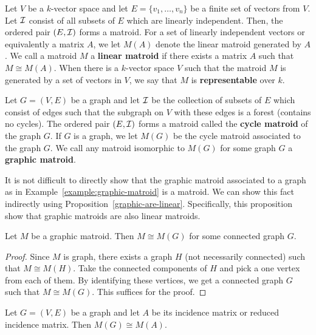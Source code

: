 \documentclass{puthesis-UG}
\begin{document}
\begin{example}  \label{linear-matroid}
	Let $V$ be a $k$-vector space and let $E = \{v_1, \ldots, v_n\}$ be a finite set of vectors from $V$. Let $\mathcal{I}$ consist of all subsets of $E$ which are linearly independent. Then, the ordered pair $(E, \mathcal{I})$ forms a matroid. For a set of linearly independent vectors or equivalently a matrix $A$, we let $M(A)$ denote the linear matroid generated by $A$. We call a matroid $M$ a \textbf{linear matroid} if there exists a matrix $A$ such that $M \cong M(A)$. When there is a $k$-vector space $V$ such that the matroid $M$ is generated by a set of vectors in $V$, we say that $M$ is \textbf{representable} over $k$. 
\end{example}

\begin{example}  \label{example:graphic-matroid}
	Let $G = (V, E)$ be a graph and let $\mathcal{I}$ be the collection of subsets of $E$ which consist of edges such that the subgraph on $V$ with these edges is a forest (contains no cycles). The ordered pair $(E, \mathcal{I})$ forms a matroid called the \textbf{cycle matroid} of the graph $G$. If $G$ is a graph, we let $M(G)$ be the cycle matroid associated to the graph $G$. We call any matroid isomorphic to $M(G)$ for some graph $G$ a \textbf{graphic matroid}. 
\end{example}

It is not difficult to directly show that the graphic matroid associated to a graph as in Example~\ref{example:graphic-matroid} is a matroid. We can show this fact indirectly using Proposition~\ref{graphic-are-linear}. Specifically, this proposition show that graphic matroids are also linear matroids.

\begin{prop} \label{prop:graphic-matroids-connected}
	Let $M$ be a graphic matroid. Then $M \cong M(G)$ for some connected graph $G$. 
\end{prop}
\begin{proof}
	Since $M$ is graph, there exists a graph $H$ (not necessarily connected) such that $M \cong M(H)$. Take the connected components of $H$ and pick a one vertex from each of them. By identifying these vertices, we get a connected graph $G$ such that $M \cong M(G)$. This suffices for the proof. 
\end{proof}

\begin{prop} \label{graphic-are-linear}
	Let $G = (V, E)$ be a graph and let $A$ be its incidence matrix or reduced incidence matrix. Then $M(G) \cong M(A)$. 
\end{prop}
\end{document}

